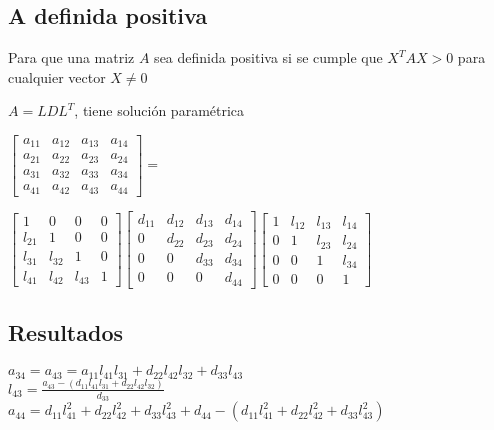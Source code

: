 \subsection*{A definida positiva}
Para que una matriz $A$ sea definida positiva si se cumple que $X^TAX>0$ para cualquier vector $X\neq0$
\begin{center}
$A=LDL^T$, tiene soluci\'on param\'etrica
\end{center}
\begin{center}
$\begin{bmatrix}
a_{11} & a_{12} & a_{13} & a_{14} \\
a_{21} & a_{22} & a_{23} & a_{24} \\
a_{31} & a_{32} & a_{33} & a_{34} \\
a_{41} & a_{42} & a_{43} & a_{44} 
\end{bmatrix}=$ \end{center}\begin{center}
$\begin{bmatrix}
1 & 0 & 0 & 0 \\
l_{21} & 1 & 0 & 0 \\
l_{31} & l_{32} & 1 & 0 \\
l_{41} & l_{42} & l_{43} & 1 
\end{bmatrix} \begin{bmatrix}
d_{11} & d_{12} & d_{13} & d_{14} \\
0 & d_{22} & d_{23} & d_{24} \\
0 & 0 & d_{33} & d_{34} \\
0 & 0 & 0 & d_{44} 
\end{bmatrix} \begin{bmatrix}
1 & l_{12} & l_{13} & l_{14} \\
0 & 1 & l_{23} & l_{24} \\
0 & 0 & 1 & l_{34} \\
0 & 0 & 0 & 1
\end{bmatrix}
$\end{center}
\subsection*{Resultados}
$a_{34}=a_{43}=a_{11}l_{41}l_{31}+d_{22}l_{42}l_{32}+d_{33}l_{43}$ \\
$l_{43}=\frac{a_{43}-(d_{11}l_{41}l_{31}+d_{22}l_{42}l_{32})}{d_{33}}$ \\
$a_{44}=d_{11}l_{41}^2+d_{22}l_{42}^2+d_{33}l_{43}^2+d_{44}-(d_{11}l_{41}^2+d_{22}l_{42}^2+d_{33}l_{43}^2)$ \\
